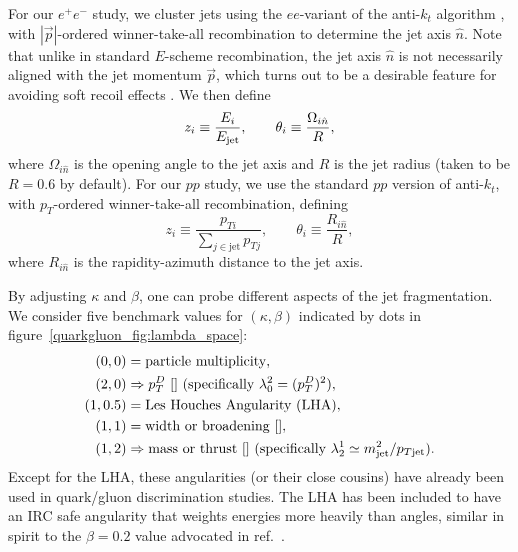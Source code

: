 \documentclass[11pt]{cernrep}
\begin{document}
For our $e^+ e^-$ study, we cluster jets using the $ee$-variant of the anti-$k_t$ algorithm \cite{}, with $|\vec{p}|$-ordered winner-take-all recombination \cite{} to determine the jet axis $\hat{n}$.  Note that unlike in standard $E$-scheme recombination, the jet axis $\hat{n}$ is not necessarily aligned with the jet momentum $\vec{p}$, which turns out to be a desirable feature for avoiding soft recoil effects \cite{}.  We then define
\begin{equation}
z_i \equiv \frac{E_i}{E_{\rm jet}}, \qquad \theta_i \equiv \frac{\Omega_{i \hat{n}}}{R},
\end{equation}
where $\Omega_{i \hat{n}}$ is the opening angle to the jet axis and $R$ is the jet radius (taken to be $R = 0.6$ by default).  For our $pp$ study, we use the standard $pp$ version of anti-$k_t$, with $p_T$-ordered winner-take-all recombination, defining
\begin{equation}
z_i \equiv \frac{p_{Ti}}{\sum_{j \in \text{jet}} p_{Tj}}, \qquad \theta_i \equiv \frac{R_{i \hat{n}}}{R},
\end{equation}
where $R_{i \hat{n}}$ is the rapidity-azimuth distance to the jet axis.

By adjusting $\kappa$ and $\beta$, one can probe different aspects of the jet fragmentation.  We consider five benchmark values for $(\kappa, \beta)$ indicated by dots in figure~\ref{quarkgluon_fig:lambda_space}:
\begin{equation}
\label{eq:benchmarkang}
\begin{aligned}
(0,0) &= \text{particle multiplicity},\\
(2,0) &\Rightarrow p_T^D \text{  \cite{} (specifically $\lambda^{2}_{0} = (p_T^D)^2$)},\\
(1,0.5) & = \text{Les Houches Angularity (LHA)},\\
(1,1) &= \text{width or broadening \cite{}} ,\\
(1,2) & \Rightarrow \text{mass or thrust \cite{} (specifically $\lambda^{1}_{2} \simeq m_{\rm jet}^2 / p_{T{\rm jet}}$)}.
\end{aligned}
\end{equation}
Except for the LHA, these angularities (or their close cousins) have already been used in quark/gluon discrimination studies.  The LHA has been included to have an IRC safe angularity that weights energies more heavily than angles, similar in spirit to the $\beta = 0.2$ value advocated in ref.~\cite{}.
\end{document}
